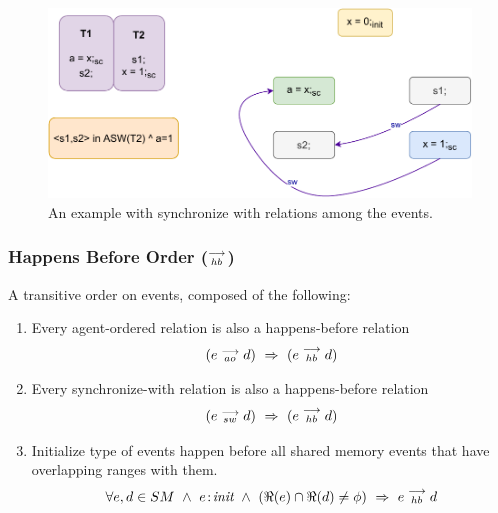        \begin{figure}[H]
            \centering
            \includegraphics[scale=0.7]{ECMAScriptMemoryModel/SynchronizeWith.pdf}
            \caption{An example with synchronize with relations among the events.}
        \end{figure}

        
    \subsubsection{Happens Before Order ($\stackrel{\longrightarrow}{_{hb}}$)}
        A transitive order on events, composed of the following:
        
        \begin{enumerate}
            \item Every agent-ordered relation is also a happens-before relation 
                \begin{align*}
                    (\reln{e}{ao}{d}) \ \Rightarrow{} \ (\reln{e}{hb}{d})    
                \end{align*}
                
            \item Every synchronize-with relation is also a happens-before relation 
                \begin{align*}
                    (\reln{e}{sw}{d}) \ \Rightarrow{} \ (\reln{e}{hb}{d})    
                \end{align*}
                 
            \item Initialize type of events happen before all shared memory events that have overlapping ranges with them. 
                \begin{align*}
                    \forall e,d \in SM \ \wedge \ 
                    \et{e}{init} \ \wedge \ 
                    (\Re(e) \cap \Re(d) \neq \phi)
                    \ \Rightarrow{} \ 
                    \reln{e}{hb}{d}
                \end{align*}          
        \end{enumerate}
    
